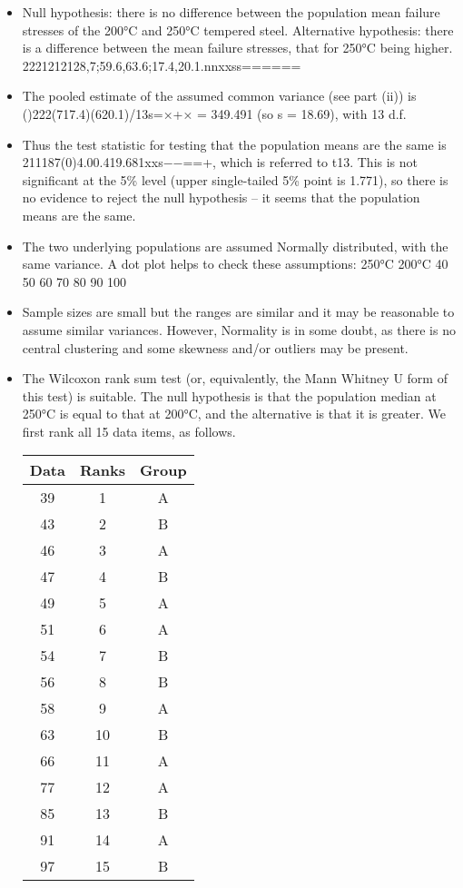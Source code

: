 \documentclass[a4paper,12pt]{article}
\begin{document}
\begin{itemize}
\item Null hypothesis: there is no difference between the population mean failure stresses of the 200°C and 250°C tempered steel. Alternative hypothesis: there is a difference between the mean failure stresses, that for 250°C being higher.
2221212128,7;59.6,63.6;17.4,20.1.nnxxss======

\item 
The pooled estimate of the assumed common variance (see part (ii)) is ()222(717.4)(620.1)/13s=×+× = 349.491 (so s = 18.69), with 13 d.f.
\item Thus the test statistic for testing that the population means are the same is
211187(0)4.00.419.681xxs−−==+,
which is referred to t13. This is not significant at the 5\% level (upper single-tailed 5\% point is 1.771), so there is no evidence to reject the null hypothesis – it seems that the population means are the same.
\item The two underlying populations are assumed Normally distributed, with the same variance. A dot plot helps to check these assumptions:
250°C
200°C
40
50
60
70
80
90
100
\item Sample sizes are small but the ranges are similar and it may be reasonable to assume similar variances. However, Normality is in some doubt, as there is no central clustering and some skewness and/or outliers may be present.


\item The Wilcoxon rank sum test (or, equivalently, the Mann Whitney U form of this test) is suitable. The null hypothesis is that the population median at 250°C is equal to that at 200°C, and the alternative is that it is greater. We first rank all 15 data items, as follows.
\begin{center}
\begin{tabular}{c|c|c}
Data	&	Ranks	&	Group	\\ \hline
39	&	1	&	A	\\ \hline
43	&	2	&	B	\\ \hline
46	&	3	&	A	\\ \hline
47	&	4	&	B	\\ \hline
49	&	5	&	A	\\ \hline
51	&	6	&	A	\\ \hline
54	&	7	&	B	\\ \hline
56	&	8	&	B	\\ \hline
58	&	9	&	A	\\ \hline
63	&	10	&	B	\\ \hline
66	&	11	&	A	\\ \hline
77	&	12	&	A	\\ \hline
85	&	13	&	B	\\ \hline
91	&	14	&	A	\\ \hline
97	&	15	&	B	\\ \hline
					

\end{tabular}
\end{center}
\end{itemize}
\end{document}
